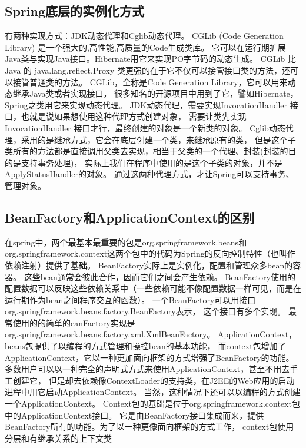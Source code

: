 \documentclass{book}
\begin{document}
\subsection{Spring底层的实例化方式}

有两种实现方式：JDK动态代理和Cglib动态代理。
CGLib (Code Generation Library) 是一个强大的,高性能,高质量的Code生成类库。
它可以在运行期扩展Java类与实现Java接口。Hibernate用它来实现PO字节码的动态生成。
CGLib 比 Java 的 java.lang.reflect.Proxy 类更强的在于它不仅可以接管接口类的方法，还可以接管普通类的方法。
CGLib，全称是Code Generation Library，它可以用来动态继承Java类或者实现接口，
很多知名的开源项目中用到了它，譬如Hibernate，Spring之类用它来实现动态代理。
JDK动态代理，需要实现InvocationHandler 接口，也就是说如果想使用这种代理方式创建对象，
需要让类先实现InvocationHandler 接口才行，最终创建的对象是一个新类的对象。
Cglib动态代理，采用的是继承方式，它会在底层创建一个类，来继承原有的类，
但是这个子类所有的方法都是直接调用父类去实现，相当于父类的一个代理、封装(封装的目的是支持事务处理)，
实际上我们在程序中使用的是这个子类的对象，并不是ApplyStatusHandler的对象。
通过这两种代理方式，才让Spring可以支持事务、管理对象。

\subsection{BeanFactory和ApplicationContext的区别}

在spring中，两个最基本最重要的包是org.springframework.beans和
org.springframework.context这两个包中的代码为Spring的反向控制特性（也叫作依赖注射）提供了基础。
BeanFactory实际上是实例化，配置和管理众多bean的容器。 
这些bean通常会彼此合作，因而它们之间会产生依赖。
BeanFactory使用的配置数据可以反映这些依赖关系中（一些依赖可能不像配置数据一样可见，而是在运行期作为bean之间程序交互的函数）。
一个BeanFactory可以用接口org.springframework.beans.factory.BeanFactory表示， 这个接口有多个实现。 最常使用的的简单的eanFactory实现是org.springframework.beans.factory.xml.XmlBeanFactory。
ApplicationContext，beans包提供了以编程的方式管理和操控bean的基本功能，
而context包增加了ApplicationContext，它以一种更加面向框架的方式增强了BeanFactory的功能。
多数用户可以以一种完全的声明式方式来使用ApplicationContext，甚至不用去手工创建它，
但是却去依赖像ContextLoader的支持类，在J2EE的Web应用的启动进程中用它启动ApplicationContext。
当然，这种情况下还可以以编程的方式创建一个ApplicationContext。
Context包的基础是位于org.springframework.context包中的ApplicationContext接口。
它是由BeanFactory接口集成而来，提供BeanFactory所有的功能。为了以一种更像面向框架的方式工作，
context包使用分层和有继承关系的上下文类
\end{document}
